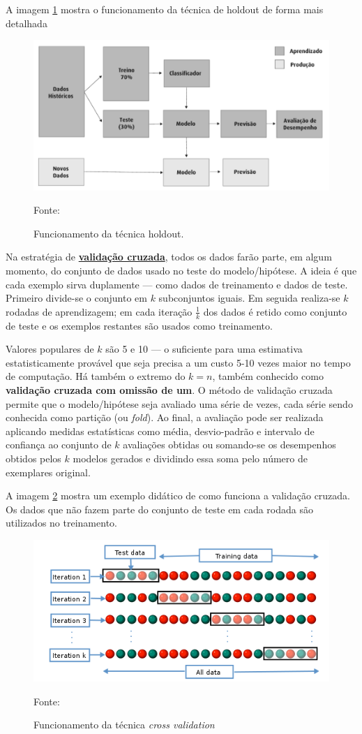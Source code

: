 A imagem \ref{fig:img_holdout} mostra o funcionamento da técnica de holdout de forma mais detalhada
\begin{figure}[h!]
	\centering
	\includegraphics[width=.6\textwidth]{imagens/hold_out.png}
	\caption{Funcionamento da técnica holdout.}
	{\scriptsize Fonte:\cite{aprenda_mineracao_fernando_amaral16}}
	\label{fig:img_holdout}
\end{figure}

Na estratégia de \textbf{\underline{validação cruzada}}, todos os dados farão parte, em algum momento, do conjunto de dados usado no teste do modelo/hipótese. A ideia é que cada exemplo sirva duplamente --- como dados de treinamento e dados de teste. Primeiro divide-se o conjunto em $k$ subconjuntos iguais. Em seguida realiza-se $k$ rodadas de aprendizagem; em cada iteração $\frac{1}{k}$ dos dados é retido como conjunto de teste e os exemplos restantes são usados como treinamento. 

Valores populares de $k$ são 5 e 10 --- o suficiente para uma estimativa estatisticamente provável que seja precisa a um custo 5-10 vezes maior no tempo de computação. Há também o extremo do $k = n$, também conhecido como \textbf{validação cruzada com omissão de um}. O método de validação cruzada permite que o modelo/hipótese seja avaliado uma série de vezes, cada série sendo conhecida como partição (ou \textit{fold}). Ao final, a avaliação pode ser realizada aplicando medidas estatísticas como média, desvio-padrão e intervalo de confiança ao conjunto de $k$ avaliações obtidas ou somando-se os desempenhos obtidos pelos $k$ modelos gerados e dividindo essa soma pelo número de exemplares original. \cite{Norvig2013}\cite{Boscarioli2017}\cite{ferrari2017} \cite{aprenda_mineracao_fernando_amaral16}

A imagem \ref{fig:img_cross_validation} mostra um exemplo didático de como funciona a validação cruzada. Os dados que não fazem parte do conjunto de teste em cada rodada são utilizados no treinamento.

\begin{figure}[h!]
	\centering
	\includegraphics[width=.6\textwidth]{imagens/cross_validation.png}
	\caption{Funcionamento da técnica \textit{cross validation}}
	{\scriptsize Fonte:\cite{fold_cross_validation:k-fold_nodate}}
	\label{fig:img_cross_validation}
\end{figure}

